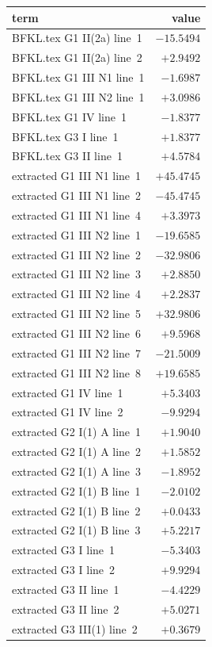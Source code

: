 \documentclass[10pt]{article}
\numberwithin{equation}{section}
\begin{document}
\begin{longtable}{@{}lr@{}}\toprule
term & value\\\midrule
BFKL.tex G1 II(2a) line~1 & $-15.5494$\\
BFKL.tex G1 II(2a) line~2 & $+2.9492$\\
BFKL.tex G1 III N1 line~1 & $-1.6987$\\
BFKL.tex G1 III N2 line~1 & $+3.0986$\\
BFKL.tex G1 IV line~1 & $-1.8377$\\
BFKL.tex G3 I line~1 & $+1.8377$\\
BFKL.tex G3 II line~1 & $+4.5784$\\
extracted G1 III N1 line~1 & $+45.4745$\\
extracted G1 III N1 line~2 & $-45.4745$\\
extracted G1 III N1 line~4 & $+3.3973$\\
extracted G1 III N2 line~1 & $-19.6585$\\
extracted G1 III N2 line~2 & $-32.9806$\\
extracted G1 III N2 line~3 & $+2.8850$\\
extracted G1 III N2 line~4 & $+2.2837$\\
extracted G1 III N2 line~5 & $+32.9806$\\
extracted G1 III N2 line~6 & $+9.5968$\\
extracted G1 III N2 line~7 & $-21.5009$\\
extracted G1 III N2 line~8 & $+19.6585$\\
extracted G1 IV line~1 & $+5.3403$\\
extracted G1 IV line~2 & $-9.9294$\\
extracted G2 I(1) A line~1 & $+1.9040$\\
extracted G2 I(1) A line~2 & $+1.5852$\\
extracted G2 I(1) A line~3 & $-1.8952$\\
extracted G2 I(1) B line~1 & $-2.0102$\\
extracted G2 I(1) B line~2 & $+0.0433$\\
extracted G2 I(1) B line~3 & $+5.2217$\\
extracted G3 I line~1 & $-5.3403$\\
extracted G3 I line~2 & $+9.9294$\\
extracted G3 II line~1 & $-4.4229$\\
extracted G3 II line~2 & $+5.0271$\\
extracted G3 III(1) line~2 & $+0.3679$\\

\end{longtable}
\end{document}
